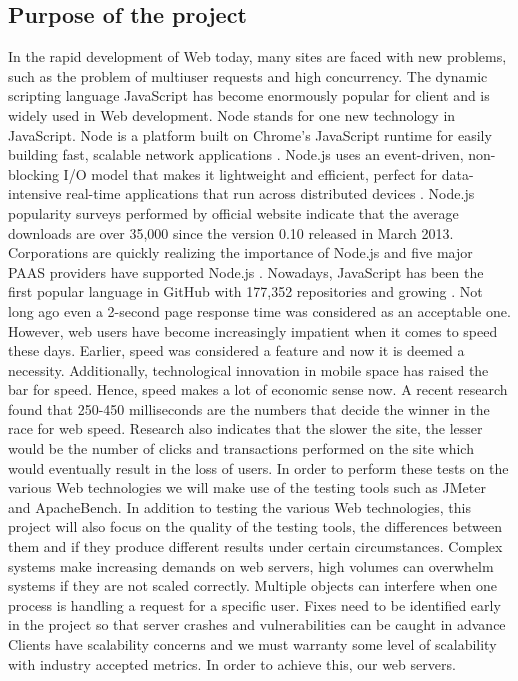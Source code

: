\documentclass[../thesis.tex]{subfiles}
\begin{document}
\subsection{Purpose of the project}
In the rapid development of Web today, many sites are faced with new problems, such as the problem of multiuser requests and high concurrency. The dynamic scripting language JavaScript has become enormously popular for client and is widely used in Web development. Node stands for one new technology in JavaScript. Node is a platform built on Chrome's JavaScript runtime for easily building fast, scalable network applications \cite{server}. Node.js uses an event-driven, non- blocking I/O model that makes it lightweight and efficient, perfect for data-intensive real-time applications that run across distributed devices \cite{server}. Node.js popularity surveys performed by official website indicate that the average downloads are over 35,000 since the version 0.10 released in March 2013. Corporations are quickly realizing the importance of Node.js and five major PAAS providers have supported Node.js \cite{node}. Nowadays, JavaScript has been the first popular language in GitHub with 177,352 repositories and growing \cite{github-js}. 
\vspace{5mm}
Not long ago even a 2-second page response time was considered as an acceptable one. However, web users have become increasingly impatient when it comes to speed these days. Earlier, speed was considered a feature and now it is deemed a necessity. Additionally, technological innovation in mobile space has raised the bar for speed. Hence, speed makes a lot of economic sense now. A recent research found that 250-450 milliseconds are the numbers that decide the winner in the race for web speed. Research also indicates that the slower the site, the lesser would be the number of clicks and transactions performed on the site which would eventually result in the loss of users.
\vspace{5mm}
In order to perform these tests on the various Web technologies we will make use of the testing tools such as JMeter and ApacheBench. In addition to testing the various Web technologies, this project will also focus on the quality of the testing tools, the differences between them and if they produce different results under certain circumstances. Complex systems make increasing demands on web servers, high volumes can overwhelm systems if they are not scaled correctly. Multiple objects can interfere when one process is handling a request for a specific user. Fixes need to be identified early in the project so that server crashes and vulnerabilities can be caught in advance Clients have scalability concerns and we must warranty some level of scalability with industry accepted metrics. In order to achieve this, our web servers.
\end{document}
